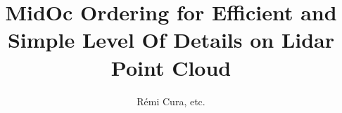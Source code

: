 
	

\title{ MidOc Ordering for Efficient and Simple Level Of Details on Lidar Point Cloud}
\author{R\'emi Cura, etc.}



\maketitle
\tableofcontents
\newpage


	
	\newpage

	
	\newpage

	
	\newpage
	
	
	\newpage

%	
	\newpage
 
%	
	\newpage



%	
%


%	
%		
%
%	 	
%		





